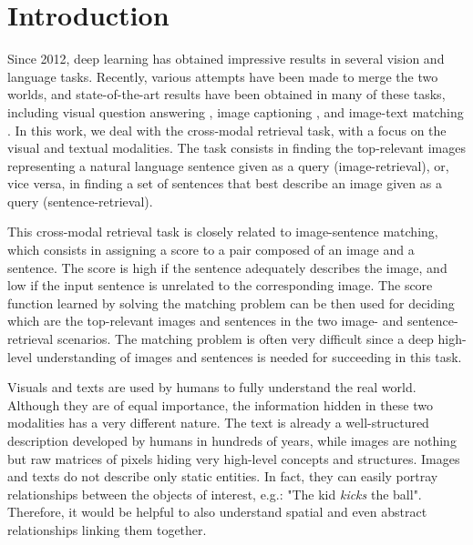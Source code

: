 \documentclass[acmsmall]{acmart}
\begin{document}



\maketitle

\section{Introduction}

Since 2012, deep learning has obtained impressive results in several vision and language tasks. Recently, various attempts have been made to merge the two worlds, and state-of-the-art results have been obtained in many of these tasks, including visual question answering \cite{hu2017learning,Anderson2018bottomup,teney2017graph}, image captioning \cite{zhou2020unified,rennie2017self,huang2019attention,cornia2019show}, and image-text matching \cite{chen2019uniter,lu2019vilbert,vsepp2018faghri,lee2018stackedcrossattention}. In this work, we deal with the cross-modal retrieval task, with a focus on the visual and textual modalities. 
The task consists in finding the top-relevant images representing a natural language sentence given as a query (image-retrieval), or, vice versa, in finding a set of sentences that best describe an image given as a query (sentence-retrieval).

This cross-modal retrieval task is closely related to image-sentence matching, which consists in assigning a score to a pair composed of an image and a sentence. The score is high if the sentence adequately describes the image, and low if the input sentence is unrelated to the corresponding image. The score function learned by solving the matching problem can be then used for deciding which are the top-relevant images and sentences in the two image- and sentence- retrieval scenarios. The matching problem is often very difficult since a deep high-level understanding of images and sentences is needed for succeeding in this task. 

Visuals and texts are used by humans to fully understand the real world. Although they are of equal importance, the information hidden in these two modalities has a very different nature. The text is already a well-structured description developed by humans in hundreds of years, while images are nothing but raw matrices of pixels hiding very high-level concepts and structures. Images and texts do not describe only static entities. In fact, they can easily portray relationships between the objects of interest, e.g.: "The kid \textit{kicks} the ball". Therefore, it would be helpful to also understand spatial and even abstract relationships linking them together. 
\end{document}
